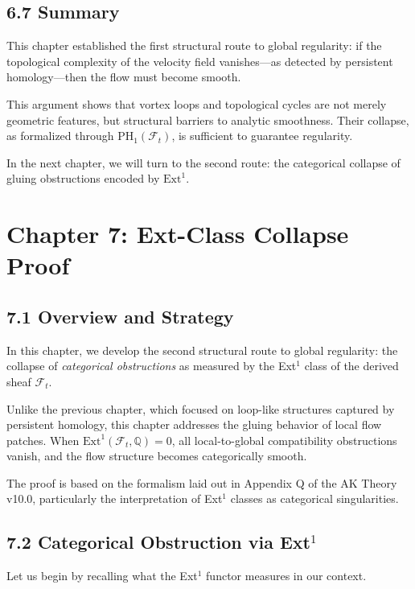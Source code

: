 \documentclass[11pt]{article}
\begin{document}
\subsection{6.7 Summary}

This chapter established the first structural route to global regularity:  
if the topological complexity of the velocity field vanishes—as detected by persistent homology—then the flow must become smooth.

This argument shows that vortex loops and topological cycles are not merely geometric features,  
but structural barriers to analytic smoothness.  
Their collapse, as formalized through \( \mathrm{PH}_1(\mathcal{F}_t) \),  
is sufficient to guarantee regularity.

In the next chapter, we will turn to the second route:  
the categorical collapse of gluing obstructions encoded by \( \mathrm{Ext}^1 \).



\section{Chapter 7: Ext-Class Collapse Proof}

\subsection{7.1 Overview and Strategy}

In this chapter, we develop the second structural route to global regularity:  
the collapse of \emph{categorical obstructions} as measured by the Ext$^1$ class of the derived sheaf \( \mathcal{F}_t \).

Unlike the previous chapter, which focused on loop-like structures captured by persistent homology,  
this chapter addresses the gluing behavior of local flow patches.  
When \( \mathrm{Ext}^1(\mathcal{F}_t, \mathbb{Q}) = 0 \), all local-to-global compatibility obstructions vanish,  
and the flow structure becomes categorically smooth.

The proof is based on the formalism laid out in Appendix Q of the AK Theory v10.0,  
particularly the interpretation of Ext$^1$ classes as categorical singularities.

\subsection{7.2 Categorical Obstruction via Ext$^1$}

Let us begin by recalling what the Ext$^1$ functor measures in our context.
\end{document}
